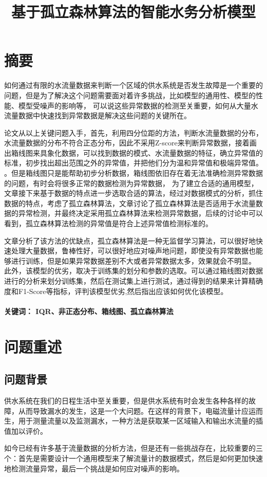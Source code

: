 \documentclass[UTF8]{article}
\begin{document}
	\title{\heiti \textbf {基于孤立森林算法的智能水务分析模型}\vspace{-2em}}
	\date{}
	\author{}
	\maketitle
	\section*{\centering 摘要}
		\par 如何通过有限的水流量数据来判断一个区域的供水系统是否发生故障是一个重要的问题，但是为了解决这个问题需要面对着许多挑战，比如模型的通用性、模型的性能、模型受噪声的影响等，
		可以说这些异常数据的检测至关重要，如何从大量水流量数据中快速找到异常数据是解决这些问题的关键所在。
		\par 论文从以上关键问题入手，首先，利用四分位距的方法，判断水流量数据的分布，水流量数据的分布不符合正态分布，因此不采用Z-score来判断异常数据，接着画出箱线图来具象化数据，可以找到数据的模式、水流量数据的特征，确立异常值的标准，初步找出超出范围之外的异常值，并把他们分为温和异常值和极端异常值。
		。但是箱线图只是能帮助初步分析数据，箱线图依旧存在着无法准确检测异常数据的问题，有时会将很多正常的数据检测为异常数据，
		为了建立合适的通用模型，文章接下来基于数据的特点进一步选取合适的算法，经过对数据模式的分析，抓住数据的特点，考虑了孤立森林算法，文章讨论了孤立森林算法是否适用于水流量数据的异常检测，并最终决定采用孤立森林算法来检测异常数据，后续的讨论中可以看到，孤立森林算法检测的异常值是符合上述异常值检测标准的。
		\par 文章分析了该方法的优缺点，孤立森林算法是一种无监督学习算法，可以很好地快速处理大量数据，鲁棒性好，可以很好地应对噪声地问题，即使没有异常数据也能够进行训练，但是如果异常数据差别不大或者异常数据太多，效果就会不明显。
		此外，该模型的优劣，取决于训练集的划分和参数的选取。可以通过箱线图对数据进行的分析来划分训练集，然后在测试集上进行测试，通过得到的结果来计算精确度和F1-Score等指标，评判该模型优劣,然后指出应该如何优化该模型。
		\\ 
		\\
		\textbf{\centering 关键词： IQR、非正态分布、箱线图、孤立森林算法}
		\newpage
	\section{问题重述}
		\subsection{问题背景}
		\par 供水系统在我们的日程生活中至关重要，但是供水系统有时会发生各种各样的故障，从而导致漏水的发生，这是一个大问题。在这样的背景下，电磁流量计应运而生，用于测量流量以及监测漏水，一种方法是获取某一区域输入和输出水流量的插值加以评价。 
		\par 如今已经有许多基于流量数据的分析方法，但是还有一些挑战存在，比较重要的三个：首先是需要设计一个通用模型来了解流量计的数据模式，然后是如何更加快速地检测流量异常，最后一个挑战是如何应对噪声的影响。\cite[C1]{znswxxh}
\end{document}
